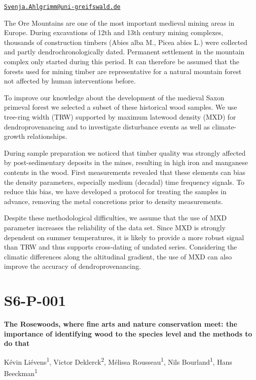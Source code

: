 \documentclass[
]{book}
\begin{document}
\href{mailto:Svenja.Ahlgrimm@uni-greifswald.de}{\nolinkurl{Svenja.Ahlgrimm@uni-greifswald.de}}

The Ore Mountains are one of the most important medieval mining areas in Europe. During excavations of 12th and 13th century mining complexes, thousands of construction timbers (Abies alba M., Picea abies L.) were collected and partly dendrochronologically dated. Permanent settlement in the mountain complex only started during this period. It can therefore be assumed that the forests used for mining timber are representative for a natural mountain forest not affected by human interventions before.

To improve our knowledge about the development of the medieval Saxon primeval forest we selected a subset of these historical wood samples. We use tree-ring width (TRW) supported by maximum latewood density (MXD) for dendroprovenancing and to investigate disturbance events as well as climate-growth relationships.

During sample preparation we noticed that timber quality was strongly affected by post-sedimentary deposits in the mines, resulting in high iron and manganese contents in the wood. First measurements revealed that these elements can bias the density parameters, especially medium (decadal) time frequency signals. To reduce this bias, we have developed a protocol for treating the samples in advance, removing the metal concretions prior to density measurements.

Despite these methodological difficulties, we assume that the use of MXD parameter increases the reliability of the data set. Since MXD is strongly dependent on summer temperatures, it is likely to provide a more robust signal than TRW and thus supports cross-dating of undated series. Considering the climatic differences along the altitudinal gradient, the use of MXD can also improve the accuracy of dendroprovenancing.

\hypertarget{s6-p-001}{%
\section*{S6-P-001}\label{s6-p-001}}

\textbf{The Rosewoods, where fine arts and nature conservation meet: the importance of identifying wood to the species level and the methods to do that}

Kévin Liévens\textsuperscript{1}, Victor Deklerck\textsuperscript{2}, Mélissa Rousseau\textsuperscript{1}, Nils Bourland\textsuperscript{1}, Hans Beeckman\textsuperscript{1}
\end{document}
